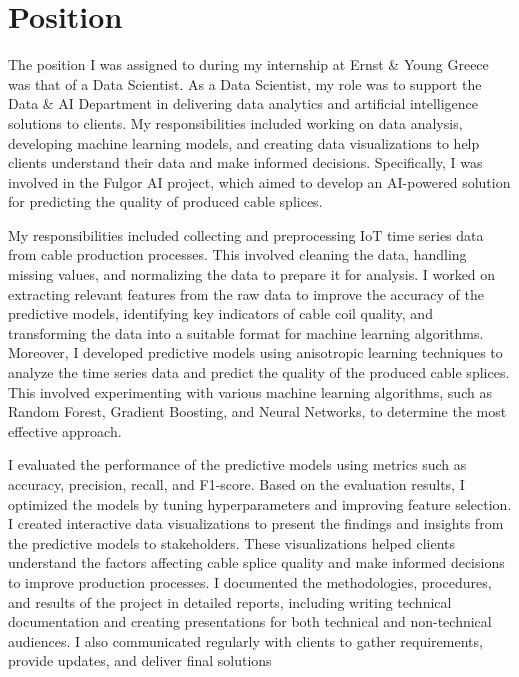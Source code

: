\section{Position}

The position I was assigned to during my internship at Ernst \& Young Greece
was that of a Data Scientist. As a Data Scientist, my role was to support the
Data \& AI Department in delivering data analytics and artificial intelligence
solutions to clients. My responsibilities included working on data analysis,
developing machine learning models, and creating data visualizations to help
clients understand their data and make informed decisions. Specifically, I was
involved in the Fulgor AI project, which aimed to develop an AI-powered
solution for predicting the quality of produced cable splices.

My responsibilities included collecting and preprocessing IoT time series data
from cable production processes. This involved cleaning the data, handling
missing values, and normalizing the data to prepare it for analysis. I worked
on extracting relevant features from the raw data to improve the accuracy of
the predictive models, identifying key indicators of cable coil quality, and
transforming the data into a suitable format for machine learning algorithms.
Moreover, I developed predictive models using anisotropic learning techniques
to analyze the time series data and predict the quality of the produced cable
splices. This involved experimenting with various machine learning algorithms,
such as Random Forest, Gradient Boosting, and Neural Networks, to determine the
most effective approach.

I evaluated the performance of the predictive models using metrics such as
accuracy, precision, recall, and F1-score. Based on the evaluation results, I
optimized the models by tuning hyperparameters and improving feature selection.
I created interactive data visualizations to present the findings and insights
from the predictive models to stakeholders. These visualizations helped clients
understand the factors affecting cable splice quality and make informed
decisions to improve production processes. I documented the methodologies,
procedures, and results of the project in detailed reports, including writing
technical documentation and creating presentations for both technical and
non-technical audiences. I also communicated regularly with clients to gather
requirements, provide updates, and deliver final solutions

